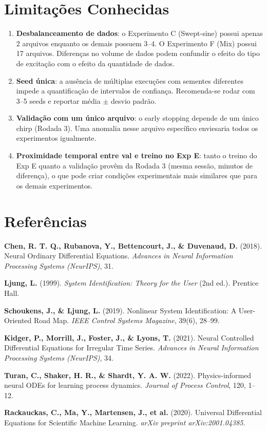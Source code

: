 \documentclass[11pt,a4paper]{article}
\begin{document}
\section{Limitações Conhecidas}

\begin{enumerate}
    \item \textbf{Desbalanceamento de dados}: o Experimento C (Swept-sine) possui apenas 2 arquivos enquanto os demais possuem 3--4. O Experimento F (Mix) possui 17 arquivos. Diferenças no volume de dados podem confundir o efeito do tipo de excitação com o efeito da quantidade de dados.
    \item \textbf{Seed única}: a ausência de múltiplas execuções com sementes diferentes impede a quantificação de intervalos de confiança. Recomenda-se rodar com 3--5 seeds e reportar média $\pm$ desvio padrão.
    \item \textbf{Validação com um único arquivo}: o early stopping depende de um único chirp (Rodada 3). Uma anomalia nesse arquivo específico enviesaria todos os experimentos igualmente.
    \item \textbf{Proximidade temporal entre val e treino no Exp E}: tanto o treino do Exp E quanto a validação provêm da Rodada 3 (mesma sessão, minutos de diferença), o que pode criar condições experimentais mais similares que para os demais experimentos.
\end{enumerate}

\section*{Referências}

\begin{enumerate}[label={[\arabic*]}]
    \item \textbf{Chen, R. T. Q., Rubanova, Y., Bettencourt, J., \& Duvenaud, D.} (2018). Neural Ordinary Differential Equations. \textit{Advances in Neural Information Processing Systems (NeurIPS)}, 31.
    \item \textbf{Ljung, L.} (1999). \textit{System Identification: Theory for the User} (2nd ed.). Prentice Hall.
    \item \textbf{Schoukens, J., \& Ljung, L.} (2019). Nonlinear System Identification: A User-Oriented Road Map. \textit{IEEE Control Systems Magazine}, 39(6), 28--99.
    \item \textbf{Kidger, P., Morrill, J., Foster, J., \& Lyons, T.} (2021). Neural Controlled Differential Equations for Irregular Time Series. \textit{Advances in Neural Information Processing Systems (NeurIPS)}, 34.
    \item \textbf{Turan, C., Shaker, H. R., \& Shardt, Y. A. W.} (2022). Physics-informed neural ODEs for learning process dynamics. \textit{Journal of Process Control}, 120, 1--12.
    \item \textbf{Rackauckas, C., Ma, Y., Martensen, J., et al.} (2020). Universal Differential Equations for Scientific Machine Learning. \textit{arXiv preprint arXiv:2001.04385}.
\end{enumerate}
\end{document}
